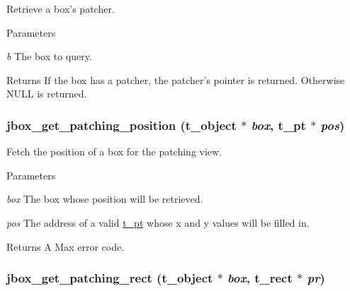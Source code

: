 Retrieve a box's patcher. 
\begin{DoxyParams}{Parameters}
\item[{\em b}]The box to query. \end{DoxyParams}
\begin{DoxyReturn}{Returns}
If the box has a patcher, the patcher's pointer is returned. Otherwise NULL is returned. 
\end{DoxyReturn}
\hypertarget{group__jbox_gaf2b95be91e66caa72238838b2068356f}{
\subsubsection[{jbox\_\-get\_\-patching\_\-position}]{ jbox\_\-get\_\-patching\_\-position ({\bf t\_\-object} $\ast$ {\em box}, \/  {\bf t\_\-pt} $\ast$ {\em pos})}}
\label{group__jbox_gaf2b95be91e66caa72238838b2068356f}


Fetch the position of a box for the patching view. 
\begin{DoxyParams}{Parameters}
\item[{\em box}]The box whose position will be retrieved. \item[{\em pos}]The address of a valid \hyperlink{structt__pt}{t\_\-pt} whose x and y values will be filled in. \end{DoxyParams}
\begin{DoxyReturn}{Returns}
A Max error code. 
\end{DoxyReturn}
\hypertarget{group__jbox_ga0e4d3502f3c114d2e9c71f309c9cade2}{
\subsubsection[{jbox\_\-get\_\-patching\_\-rect}]{ jbox\_\-get\_\-patching\_\-rect ({\bf t\_\-object} $\ast$ {\em box}, \/  {\bf t\_\-rect} $\ast$ {\em pr})}}
\label{group__jbox_ga0e4d3502f3c114d2e9c71f309c9cade2}


